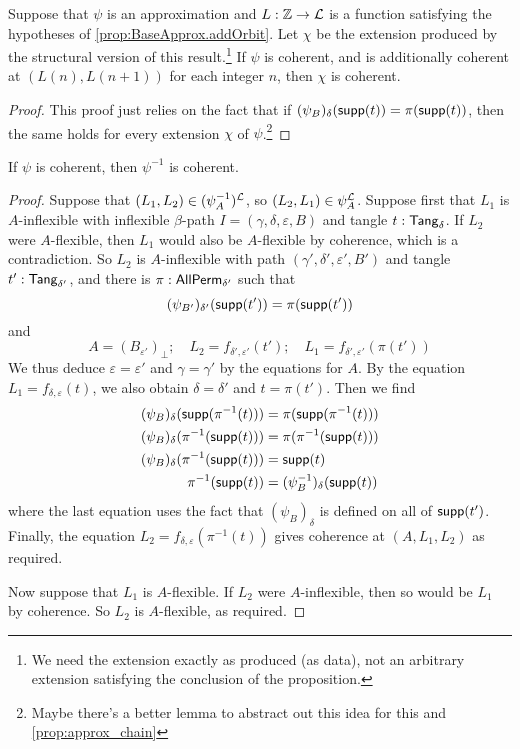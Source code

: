 \begin{proposition}
  \label{prop:StrApprox.addOrbit}
  Suppose that \( \psi \) is an approximation and \( L : \mathbb Z \to {\mathcal L} \) is a function satisfying the hypotheses of \cref{prop:BaseApprox.addOrbit}.
  Let \( \chi \) be the extension produced by the structural version of this result.\footnote{We need the extension exactly as produced (as data), not an arbitrary extension satisfying the conclusion of the proposition.}
  If \( \psi \) is coherent, and is additionally coherent at \( (L(n), L(n+1)) \) for each integer \( n \), then \( \chi \) is coherent.
\end{proposition}
\begin{proof}
  This proof just relies on the fact that if \( (\psi_B)_\delta(\operatorname{\mathsf{supp}}(t)) = \pi(\operatorname{\mathsf{supp}}(t)) \), then the same holds for every extension \( \chi \) of \( \psi \).\footnote{Maybe there's a better lemma to abstract out this idea for this and \cref{prop:approx_chain}}
\end{proof}
\begin{proposition}
  \label{prop:Coherent.inv}
  If \( \psi \) is coherent, then \( \psi^{-1} \) is coherent.
\end{proposition}
\begin{proof}
  Suppose that \( (L_1, L_2) \in (\psi^{-1}_A)^{\mathcal L} \), so \( (L_2, L_1) \in \psi_A^{\mathcal L} \).
  Suppose first that \( L_1 \) is \( A \)-inflexible with inflexible \( \beta \)-path \( I = (\gamma, \delta, \varepsilon, B) \) and tangle \( t : \mathsf{Tang}_\delta \).
  If \( L_2 \) were \( A \)-flexible, then \( L_1 \) would also be \( A \)-flexible by coherence, which is a contradiction.
  So \( L_2 \) is \( A \)-inflexible with path \( (\gamma', \delta', \varepsilon', B') \) and tangle \( t' : \mathsf{Tang}_{\delta'} \), and there is \( \pi : \mathsf{AllPerm}_{\delta'} \) such that
  \[ (\psi_{B'})_{\delta'}(\operatorname{\mathsf{supp}}(t')) = \pi(\operatorname{\mathsf{supp}}(t')) \]
  and
  \[ A = (B_{\varepsilon'})_\bot;\quad L_2 = f_{\delta',\varepsilon'}(t');\quad L_1 = f_{\delta',\varepsilon'}(\pi(t')) \]
  We thus deduce \( \varepsilon = \varepsilon' \) and \( \gamma = \gamma' \) by the equations for \( A \).
  By the equation \( L_1 = f_{\delta,\varepsilon}(t) \), we also obtain \( \delta = \delta' \) and \( t = \pi(t') \).
  Then we find
  \begin{align*}
    (\psi_B)_\delta(\operatorname{\mathsf{supp}}(\pi^{-1}(t))) &= \pi(\operatorname{\mathsf{supp}}(\pi^{-1}(t))) \\
    (\psi_B)_\delta(\pi^{-1}(\operatorname{\mathsf{supp}}(t))) &= \pi(\pi^{-1}(\operatorname{\mathsf{supp}}(t))) \\
    (\psi_B)_\delta(\pi^{-1}(\operatorname{\mathsf{supp}}(t))) &= \operatorname{\mathsf{supp}}(t) \\
    \pi^{-1}(\operatorname{\mathsf{supp}}(t)) &= (\psi^{-1}_B)_\delta(\operatorname{\mathsf{supp}}(t))
  \end{align*}
  where the last equation uses the fact that \( (\psi_B)_\delta \) is defined on all of \( \operatorname{\mathsf{supp}}(t') \).
  Finally, the equation \( L_2 = f_{\delta,\varepsilon}(\pi^{-1}(t)) \) gives coherence at \( (A, L_1, L_2) \) as required.

  Now suppose that \( L_1 \) is \( A \)-flexible.
  If \( L_2 \) were \( A \)-inflexible, then so would be \( L_1 \) by coherence.
  So \( L_2 \) is \( A \)-flexible, as required.
\end{proof}
